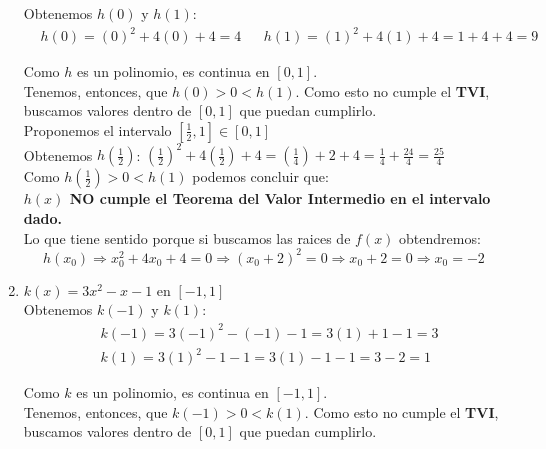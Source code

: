 \documentclass[12pt]{article}
\begin{document}
\begin{enumerate}[\hspace{9px} a)]
        Obtenemos $h(0)$ y $h(1)$:
        \begin{align*}
            &h(0)=(0)^2+4(0)+4=4 &&h(1)=(1)^2+4(1)+4=1+4+4=9
        \end{align*}

        Como $h$ es un polinomio, es continua en $[0,1]$.\\

        Tenemos, entonces, que \(h(0) > 0 < h(1)\). Como esto no cumple el \textbf{TVI}, buscamos valores dentro de $[0,1]$ que puedan cumplirlo.\\

        Proponemos el intervalo $\left[\frac{1}{2},1\right] \in [0,1]$\\

        Obtenemos \(h\left(\displaystyle\frac{1}{2}\right)\): \quad \(\left(\displaystyle\frac{1}{2}\right)^2+4\left(\displaystyle\frac{1}{2}\right)+4 = \left(\displaystyle\frac{1}{4}\right)+2+4 = \displaystyle\frac{1}{4}+\displaystyle\frac{24}{4}=\displaystyle\frac{25}{4}\)
        \\

        Como \(h\left(\displaystyle\frac{1}{2}\right) > 0 < h(1)\) podemos concluir que:\\

        \textbf{$h(x)$ NO cumple el Teorema del Valor Intermedio en el intervalo dado.}\\

        Lo que tiene sentido porque si buscamos las raices de $f(x)$ obtendremos:
        \begin{equation*}
            h(x_0) \Rightarrow x_0^2+4x_0+4=0 \Rightarrow (x_0+2)^2=0 \Rightarrow x_0+2=0 \Rightarrow x_0=-2
        \end{equation*}

    \item \(k(x)=3x^2-x-1\) en $[-1,1]$\\

        Obtenemos $k(-1)$ y $k(1)$:
        \begin{align*}
            &k(-1)=3(-1)^2-(-1)-1=3(1)+1-1=3 \\
            &k(1)=3(1)^2-1-1=3(1)-1-1=3-2=1
        \end{align*}

        Como $k$ es un polinomio, es continua en $[-1,1]$.\\

        Tenemos, entonces, que \(k(-1) > 0 < k(1)\). Como esto no cumple el \textbf{TVI}, buscamos valores dentro de $[0,1]$ que puedan cumplirlo.\\


\end{enumerate}
\end{document}
